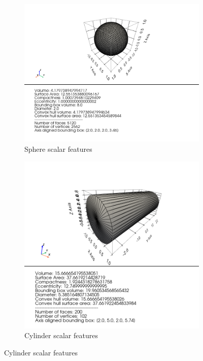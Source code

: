 \begin{figure}[ht!p]
    \centering
    \begin{subfigure}[b]{0.45\textwidth}
        \includegraphics[width=\textwidth]{assets/feature_extraction/scalar_features/sphere.png}
    \caption{Sphere scalar features}
    \label{fig:sphere-scalars}    
    \end{subfigure}
    \hfill
    \begin{subfigure}[b]{0.45\textwidth}
        \includegraphics[width=\textwidth]{assets/feature_extraction/scalar_features/cylinder.png}
    \caption{Cylinder scalar features}
    \label{fig:cylinder-scalars}
    \end{subfigure}
    \hfill
    

\end{figure}
